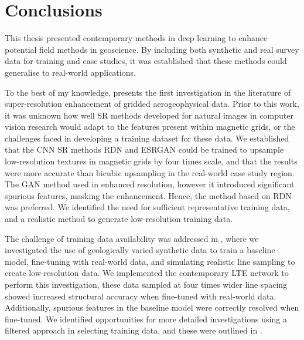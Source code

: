 \printbibliography{}

\chapter{Conclusions}
\label{ch:conclusions}
This thesis presented contemporary methods in deep learning to enhance potential field methods in geoscience.
By including both synthetic and real survey data for training and case studies, it was established that these methods could generalise to real-world applications.

To the best of my knowledge,  presents the first investigation in the literature of super-resolution enhancement of gridded aerogeophysical data.
Prior to this work, it was unknown how well SR methods developed for natural images in computer vision research would adapt to the features present within magnetic grids, or the challenges faced in developing a training dataset for these data.
We established that the CNN SR methods RDN and ESRGAN could be trained to upsample low-resolution textures in magnetic grids by four times scale, and that the results were more accurate than bicubic upsampling in the real-world case study region.
The GAN method used in  enhanced resolution, however it introduced significant spurious features, masking the enhancement.
Hence, the method based on RDN was preferred.
We identified the need for sufficient representative training data, and a realistic method to generate low-resolution training data.

The challenge of training data availability was addressed in , where we investigated the use of geologically varied synthetic data to train a baseline model, fine-tuning with real-world data, and simulating realistic line sampling to create low-resolution data.
We implemented the contemporary LTE network to perform this investigation, these data sampled at four times wider line spacing showed increased structural accuracy when fine-tuned with real-world data.
Additionally, spurious features in the baseline model were correctly resolved when fine-tuned.
We identified opportunities for more detailed investigations using a filtered approach in selecting training data, and these were outlined in .


